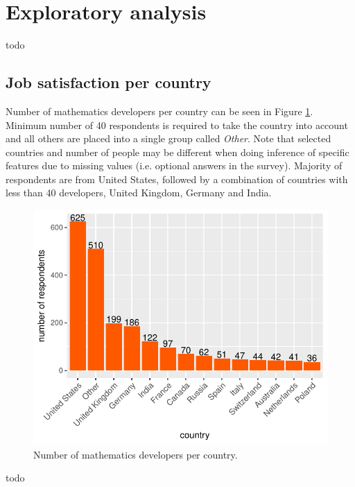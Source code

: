 \documentclass{article}
\begin{document}
\section{Exploratory analysis}
todo

\subsection{Job satisfaction per country}
Number of mathematics developers per country can be seen in Figure \ref{fig_0}. Minimum number of 40 respondents is required to take the country into account and all others are placed into a single group called \textit{Other}. Note that selected countries and number of people may be different when doing inference of specific features due to missing values (i.e. optional answers in the survey). Majority of respondents are from United States, followed by a combination of countries with less than 40 developers, United Kingdom, Germany and India.


\begin{figure}[H]
\centering
\includegraphics{report-005}
\caption{Number of mathematics developers per country.}\label{fig_0}
\end{figure}

todo
\end{document}
